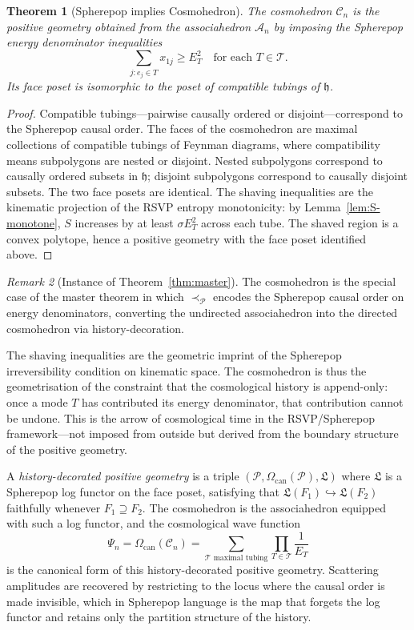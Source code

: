 \documentclass[11pt]{article}
\theoremstyle{plain}
\newtheorem{theorem}{Theorem}[section]
\theoremstyle{definition}
\theoremstyle{remark}
\newtheorem{remark}[theorem]{Remark}
\newcommand{\Sf}{S}
\newcommand{\hist}{\mathfrak{h}}
\newcommand{\Log}{\mathfrak{L}}
\newcommand{\WF}{\Psi}
\newcommand{\Assoc}{\mathcal{A}_n}
\newcommand{\Cosmo}{\mathcal{C}_n}
\newcommand{\CF}{\Omega_{\mathrm{can}}}
\begin{document}
\begin{theorem}[Spherepop implies Cosmohedron]
\label{thm:cosmo}
The cosmohedron $\Cosmo$ is the positive geometry obtained from the associahedron $\Assoc$ by imposing the Spherepop energy denominator inequalities
\[
  \sum_{j: e_j \in T} x_{1j} \geq E_T^2 \quad \text{for each } T \in \mathcal{T}.
\]
Its face poset is isomorphic to the poset of compatible tubings of $\hist$.
\end{theorem}

\begin{proof}
Compatible tubings---pairwise causally ordered or disjoint---correspond to the Spherepop causal order. The faces of the cosmohedron are maximal collections of compatible tubings of Feynman diagrams, where compatibility means subpolygons are nested or disjoint. Nested subpolygons correspond to causally ordered subsets in $\hist$; disjoint subpolygons correspond to causally disjoint subsets. The two face posets are identical. The shaving inequalities are the kinematic projection of the RSVP entropy monotonicity: by Lemma~\ref{lem:S-monotone}, $\Sf$ increases by at least $\sigma E_T^2$ across each tube. The shaved region is a convex polytope, hence a positive geometry with the face poset identified above.
\end{proof}

\begin{remark}[Instance of Theorem~\ref{thm:master}]
The cosmohedron is the special case of the master theorem in which $\prec_{\mathcal{P}}$ encodes the Spherepop causal order on energy denominators, converting the undirected associahedron into the directed cosmohedron via history-decoration.
\end{remark}

The shaving inequalities are the geometric imprint of the Spherepop irreversibility condition on kinematic space. The cosmohedron is thus the geometrisation of the constraint that the cosmological history is append-only: once a mode $T$ has contributed its energy denominator, that contribution cannot be undone. This is the arrow of cosmological time in the RSVP/Spherepop framework---not imposed from outside but derived from the boundary structure of the positive geometry.

A \emph{history-decorated positive geometry} is a triple $(\mathcal{P}, \CF(\mathcal{P}), \Log)$ where $\Log$ is a Spherepop log functor on the face poset, satisfying that $\Log(F_1) \hookrightarrow \Log(F_2)$ faithfully whenever $F_1 \supseteq F_2$. The cosmohedron is the associahedron equipped with such a log functor, and the cosmological wave function
\[
  \WF_n = \CF(\Cosmo) = \sum_{\mathcal{T}\text{ maximal tubing}} \prod_{T \in \mathcal{T}} \frac{1}{E_T}
\]
is the canonical form of this history-decorated positive geometry. Scattering amplitudes are recovered by restricting to the locus where the causal order is made invisible, which in Spherepop language is the map that forgets the log functor and retains only the partition structure of the history.
\end{document}
